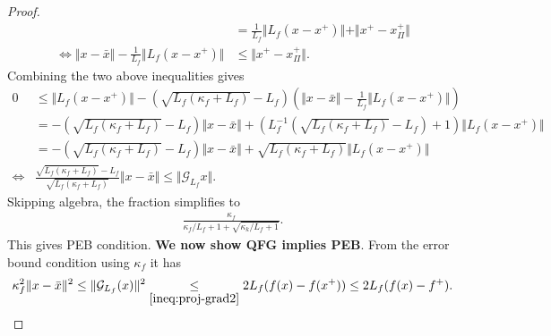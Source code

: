 \documentclass[12pt]{report}
\begin{document}
\begin{proof}
\begin{align*}
                    &= \frac{1}{L_f}\Vert L_f(x - x^+)\Vert + \Vert x^+ - x^+_\Pi\Vert
                    \\
                    \iff 
                    \Vert x - \bar x\Vert - \frac{1}{L_f}\Vert L_f(x - x^+)\Vert
                    &\le 
                    \Vert x^+ - x^+_\Pi\Vert. 
                \end{align*}
                Combining the two above inequalities gives 
                {\small
                \begin{align*}
                    0 &\le 
                    \Vert L_f(x - x^+)\Vert
                    -
                    \left(\sqrt{L_f(\kappa_f + L_f)} - L_f\right)\left(
                        \Vert x - \bar x\Vert - \frac{1}{L_f}\Vert L_f(x - x^+)\Vert
                    \right)
                    \\
                    &=
                    - \left(
                        \sqrt{L_f(\kappa_f + L_f)} - L_f
                    \right)\Vert x - \bar x\Vert
                    +
                    \left(
                        L^{-1}_f\left(\sqrt{L_f(\kappa_f + L_f)} - L_f\right) + 1
                    \right)\Vert L_f(x - x^+)\Vert
                    \\
                    &= 
                    -\left(
                        \sqrt{L_f(\kappa_f + L_f)} - L_f
                    \right)\Vert x - \bar x\Vert
                    +
                    \sqrt{L_f(\kappa_f + L_f)}
                    \Vert L_f(x - x^+)\Vert
                    \\
                    \iff&
                    \frac{\sqrt{L_f(\kappa_f + L_f)} - L_f}{\sqrt{L_f(\kappa_f + L_f)}}
                    \Vert x - \bar x\Vert 
                    \le
                    \Vert \mathcal G_{L_f}x\Vert. 
                \end{align*}
                }
                Skipping algebra, the fraction simplifies to 
                \begin{align*}
                    \frac{\kappa_f}{\kappa_f/L_f + 1 + \sqrt{\kappa_k/L_f + 1}}. 
                \end{align*}
                This gives PEB condition. 
                \textbf{We now show QFG implies PEB}. 
                From the error bound condition using $\kappa_f$ it has
                \begin{align*}
                    \kappa_f^2\Vert x - \bar x\Vert^2
                    \le \Vert \mathcal G_{L_f}(x)\Vert^2
                    \underset{\eqref{ineq:proj-grad2}}{\le }
                    2L_f(f(x) - f(x^+)) \le 2L_f(f(x) - f^+). 
                \end{align*}
            \end{proof}
\end{document}
